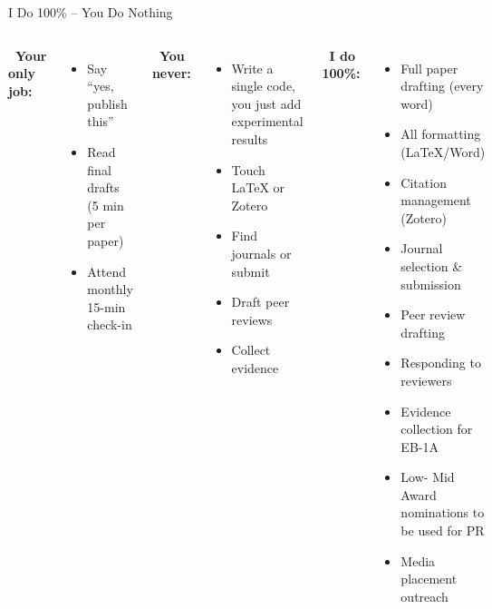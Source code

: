 \documentclass[aspectratio=169, 10pt]{beamer}
\begin{document}
	\begin{frame}{I Do 100\% – You Do Nothing}
		\begin{columns}[T]
			\textbf{\faUserCheck \ Your only job:}
			\begin{itemize}
				\item Say “yes, publish this”
				\item Read final drafts (5 min per paper)
				\item Attend monthly 15-min check-in
			\end{itemize}
			
			\vspace{0.5cm}
			\textbf{\faTimesCircle \ You never:}
			\begin{itemize}
				\item Write a single code, you just add experimental results
				\item Touch LaTeX or Zotero
				\item Find journals or submit
				\item Draft peer reviews
				\item Collect evidence
			\end{itemize}
			
			\textbf{\faRobot \ I do 100\%:}
			\begin{itemize}
				\item Full paper drafting (every word)
				\item All formatting (LaTeX/Word)
				\item Citation management (Zotero)
				\item Journal selection \& submission
				\item Peer review drafting
				\item Responding to reviewers
				\item Evidence collection for EB-1A
				\item Low- Mid Award nominations to be used for PR 
				\item Media placement outreach
			\end{itemize}
		\end{columns}
		
		\vspace{0.3cm}
		\centering
	\end{frame}
	
\end{document}
